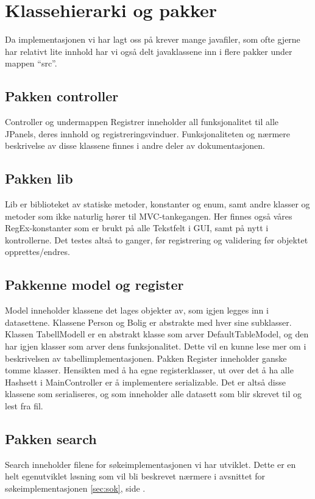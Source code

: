 \section{Klassehierarki og pakker} \label{sec:klasserogpakker}
Da implementasjonen vi har lagt oss på krever mange javafiler, som ofte gjerne har relativt lite innhold har vi også delt javaklassene inn i flere pakker under mappen “src”.

\subsection*{Pakken controller}
Controller og undermappen Registrer inneholder all funksjonalitet til alle JPanels, deres innhold og registreringsvinduer. Funksjonaliteten og nærmere beskrivelse av disse klassene finnes i andre deler av dokumentasjonen.

\subsection*{Pakken lib}
Lib er biblioteket av statiske metoder, konstanter og enum, samt andre klasser og metoder som ikke naturlig hører til MVC-tankegangen.
Her finnes også våres RegEx-konstanter som er brukt på alle Tekstfelt i GUI, samt på nytt i kontrollerne. Det testes altså to ganger, før registrering og validering før objektet opprettes/endres.

\subsection*{Pakkenne model og register}
Model inneholder klassene det lages objekter av, som igjen legges inn i datasettene. Klassene Person og Bolig er abstrakte med hver sine subklasser. Klassen TabellModell er en abstrakt klasse som arver DefaultTableModel, og den har igjen klasser som arver dens funksjonalitet. Dette vil en kunne lese mer om i beskrivelsen av tabellimplementasjonen.
Pakken Register inneholder ganske tomme klasser. Hensikten med å ha egne registerklasser, ut over det å ha alle Hashsett i MainController er å implementere serializable. Det er altså disse klassene som serialiseres, og som inneholder alle datasett som blir skrevet til og lest fra fil.

\subsection*{Pakken search}
Search inneholder filene for søkeimplementasjonen vi har utviklet. Dette er en helt egenutviklet løsning som vil bli beskrevet nærmere i avsnittet for søkeimplementasjonen \ref{sec:sok}, side \pageref{sec:sok}.

